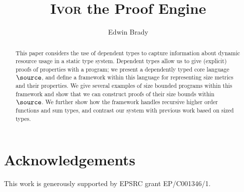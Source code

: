 \documentclass[dvips,10pt]{llncs}
\newcommand{\Ivor}{\textsc{Ivor}}
\begin{document}
\title{\Ivor{} the Proof Engine}
\author{Edwin Brady}

 
\maketitle

\begin{abstract}
This paper considers the use of dependent types to capture information
about dynamic resource usage in a static type system.  Dependent types
allow us to give \remph(explicit) proofs of properties with a program; we
present a dependently typed core language $\source$, and define a
framework within this language for representing size metrics and their
properties. We give several examples of size bounded programs within
this framework and show that we can construct proofs of their size
bounds within $\source$.
We further show how the framework handles recursive
higher order functions and sum types, and contrast our system with
previous work based on sized types.
\end{abstract}

\section*{Acknowledgements}

This work is generously supported by EPSRC grant
EP/C001346/1.


\begin{small}


%

\end{small}
\end{document}
